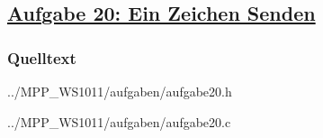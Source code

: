 \subsection*
{\href{http://cst.mi.fu-berlin.de/intern/19606-P-MPP/Aufgaben/040701.html}
{Aufgabe 20: Ein Zeichen Senden}}

\subsubsection*{Quelltext}

{../MPP_WS1011/aufgaben/aufgabe20.h}


{../MPP_WS1011/aufgaben/aufgabe20.c}
